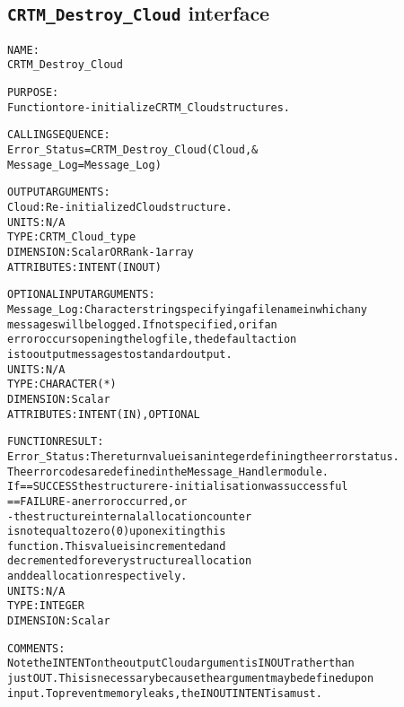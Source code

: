 \subsection{\texttt{CRTM\_Destroy\_Cloud} interface}
  \label{sec:CRTM_Destroy_Cloud_interface}
  \begin{alltt}
 
  NAME:
        CRTM_Destroy_Cloud
  
  PURPOSE:
        Function to re-initialize CRTM_Cloud structures.
 
  CALLING SEQUENCE:
        Error_Status = CRTM_Destroy_Cloud( Cloud                  , &
                                           Message_Log=Message_Log  )
 
  OUTPUT ARGUMENTS:
        Cloud:        Re-initialized Cloud structure.
                      UNITS:      N/A
                      TYPE:       CRTM_Cloud_type
                      DIMENSION:  Scalar OR Rank-1 array
                      ATTRIBUTES: INTENT(IN OUT)
 
  OPTIONAL INPUT ARGUMENTS:
        Message_Log:  Character string specifying a filename in which any
                      messages will be logged. If not specified, or if an
                      error occurs opening the log file, the default action
                      is to output messages to standard output.
                      UNITS:      N/A
                      TYPE:       CHARACTER(*)
                      DIMENSION:  Scalar
                      ATTRIBUTES: INTENT(IN), OPTIONAL
 
  FUNCTION RESULT:
        Error_Status: The return value is an integer defining the error status.
                      The error codes are defined in the Message_Handler module.
                      If == SUCCESS the structure re-initialisation was successful
                         == FAILURE - an error occurred, or
                                    - the structure internal allocation counter
                                      is not equal to zero (0) upon exiting this
                                      function. This value is incremented and
                                      decremented for every structure allocation
                                      and deallocation respectively.
                      UNITS:      N/A
                      TYPE:       INTEGER
                      DIMENSION:  Scalar
 
  COMMENTS:
        Note the INTENT on the output Cloud argument is IN OUT rather than
        just OUT. This is necessary because the argument may be defined upon
        input. To prevent memory leaks, the IN OUT INTENT is a must.
 
  \end{alltt}
